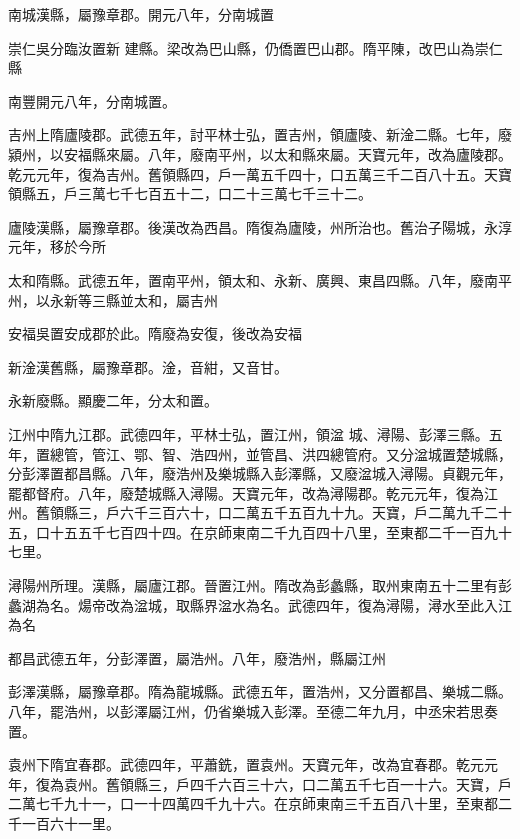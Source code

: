 \begin{pinyinscope}
 南城漢縣，屬豫章郡。開元八年，分南城置



 崇仁吳分臨汝置新
 建縣。梁改為巴山縣，仍僑置巴山郡。隋平陳，改巴山為崇仁縣



 南豐開元八年，分南城置。



 吉州上隋廬陵郡。武德五年，討平林士弘，置吉州，領廬陵、新淦二縣。七年，廢潁州，以安福縣來屬。八年，廢南平州，以太和縣來屬。天寶元年，改為廬陵郡。乾元元年，復為吉州。舊領縣四，戶一萬五千四十，口五萬三千二百八十五。天寶領縣五，戶三萬七千七百五十二，口二十三萬七千三十二。



 廬陵漢縣，屬豫章郡。後漢改為西昌。隋復為廬陵，州所治也。舊治子陽城，永淳元年，移於今所



 太和隋縣。武德五年，置南平州，領太和、永新、廣興、東昌四縣。八年，廢南平州，以永新等三縣並太和，屬吉州



 安福吳置安成郡於此。隋廢為安復，後改為安福



 新淦漢舊縣，屬豫章郡。淦，音紺，又音甘。



 永新廢縣。顯慶二年，分太和置。



 江州中隋九江郡。武德四年，平林士弘，置江州，領湓
 城、潯陽、彭澤三縣。五年，置總管，管江、鄂、智、浩四州，並管昌、洪四總管府。又分湓城置楚城縣，分彭澤置都昌縣。八年，廢浩州及樂城縣入彭澤縣，又廢湓城入潯陽。貞觀元年，罷都督府。八年，廢楚城縣入潯陽。天寶元年，改為潯陽郡。乾元元年，復為江州。舊領縣三，戶六千三百六十，口二萬五千五百九十九。天寶，戶二萬九千二十五，口十五五千七百四十四。在京師東南二千九百四十八里，至東都二千一百九十七里。



 潯陽州所理。漢縣，屬廬江郡。晉置江州。隋改為彭蠡縣，取州東南五十二里有彭蠡湖為名。煬帝改為湓城，取縣界湓水為名。武德四年，復為潯陽，潯水至此入江為名



 都昌武德五年，分彭澤置，屬浩州。八年，廢浩州，縣屬江州



 彭澤漢縣，屬豫章郡。隋為龍城縣。武德五年，置浩州，又分置都昌、樂城二縣。八年，罷浩州，以彭澤屬江州，仍省樂城入彭澤。至德二年九月，中丞宋若思奏置。



 袁州下隋宜春郡。武德四年，平蕭銑，置袁州。天寶元年，改為宜春郡。乾元元年，復為袁州。舊領縣三，戶四千六百三十六，口二萬五千七百一十六。天寶，戶二萬七千九十一，口一十四萬四千九十六。在京師東南三千五百八十里，至東都二千一百六十一里。




\end{pinyinscope}
